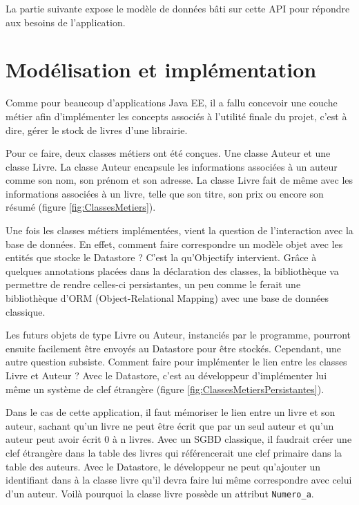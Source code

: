 La partie suivante expose le modèle de données bâti sur cette API pour répondre aux besoins de l’application.

\section{Modélisation et implémentation}
Comme pour beaucoup d’applications Java EE, il a fallu concevoir une couche métier  afin d’implémenter les concepts associés à l’utilité finale du projet, c’est à dire, gérer le stock de livres d’une librairie.

Pour ce faire, deux classes métiers ont été conçues. Une classe Auteur et une classe Livre. La classe Auteur encapsule les informations associées à un auteur comme son nom, son prénom et son adresse. La classe Livre fait de même avec les informations associées à un livre, telle que son titre, son prix ou encore son résumé (figure \ref{fig:ClassesMetiers}).


Une fois les classes métiers implémentées, vient la question de l'interaction avec la base de données. En effet, comment faire correspondre un modèle objet avec les entités que stocke le Datastore ? C’est la qu’Objectify intervient. Grâce à quelques annotations placées dans la déclaration des classes, la bibliothèque va permettre de rendre celles-ci persistantes, un peu comme le ferait une bibliothèque d’ORM (Object-Relational Mapping) avec une base de données classique.

Les futurs objets de type Livre ou Auteur, instanciés par le programme, pourront ensuite facilement être envoyés au Datastore pour être stockés. Cependant, une autre question subsiste. Comment faire pour implémenter le lien entre les classes Livre et Auteur ? Avec le Datastore, c’est au développeur d’implémenter lui même un système de clef étrangère (figure \ref{fig:ClassesMetiersPersistantes}).


Dans le cas de cette application, il faut mémoriser le lien entre un livre et son auteur, sachant qu’un livre ne peut être écrit que par un seul auteur et qu’un auteur peut avoir écrit 0 à n livres. Avec un SGBD classique, il faudrait créer une clef étrangère dans la table des livres qui référencerait une clef primaire dans la table des auteurs. Avec le Datastore, le développeur ne peut qu’ajouter un identifiant dans à la classe livre qu’il devra faire lui même correspondre avec celui d’un auteur. Voilà pourquoi la classe livre possède un attribut \verb|Numero_a|.


